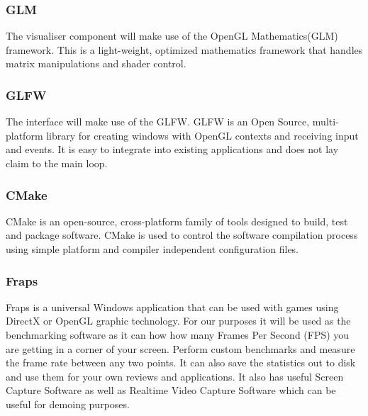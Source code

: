 \documentclass[11pt]{article}
\begin{document}
\subsubsection{GLM}
The visualiser component will make use of the OpenGL Mathematics(GLM) framework. This is a light-weight, optimized mathematics framework that handles matrix manipulations and shader control.
\subsubsection{GLFW}
The interface will make use of the GLFW. GLFW is an Open Source, multi-platform library for creating windows with OpenGL contexts and receiving input and events. It is easy to integrate into existing applications and does not lay claim to the main loop.
\subsubsection{CMake}
CMake is an open-source, cross-platform family of tools designed to build, test and package software. CMake is used to control the software compilation process using simple platform and compiler independent configuration files.
\subsubsection{Fraps}
Fraps is a universal Windows application that can be used with games using DirectX or OpenGL graphic technology. For our purposes it will be used as the benchmarking software as it can how how many Frames Per Second (FPS) you are getting in a corner of your screen.  Perform custom benchmarks and measure the frame rate between any two points. It can also save the statistics out to disk and use them for your own reviews and applications. It also has useful Screen Capture Software as well as Realtime Video Capture Software which can be useful for demoing purposes.
\end{document}

